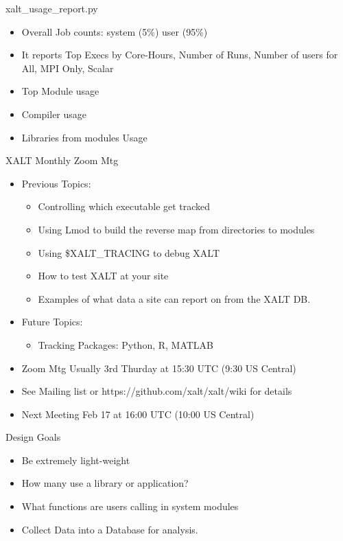 \documentclass{beamer}
\begin{document}
\begin{frame}{xalt\_usage\_report.py}
  \begin{itemize}
    \item Overall Job counts: system (5\%) user (95\%)
    \item It reports Top Execs by Core-Hours, Number of Runs,
      Number of users for All, MPI Only, Scalar
    \item Top Module usage
    \item Compiler usage
    \item Libraries from modules Usage
  \end{itemize}
\end{frame}

\begin{frame}{XALT Monthly Zoom Mtg}
  \begin{itemize}
    \item Previous Topics:
      \begin{itemize}
        \item Controlling which executable get tracked
        \item Using Lmod to build the reverse map from directories to modules
        \item Using \$XALT\_TRACING to debug XALT
        \item How to test XALT at your site
        \item Examples of what data a site can report on from the XALT DB.
      \end{itemize}
    \item Future Topics:
      \begin{itemize}
        \item Tracking Packages: Python, R, MATLAB
      \end{itemize}
    \item Zoom Mtg Usually 3rd Thurday at 15:30 UTC (9:30 US Central)
    \item See Mailing list or https://github.com/xalt/xalt/wiki for
      details
    \item Next Meeting Feb 17 at 16:00 UTC (10:00 US Central)
  \end{itemize}
\end{frame}

\begin{frame}{Design Goals}
  \begin{itemize}
    \item Be extremely light-weight
    \item How many use a library or application?
    \item What functions are users calling in system modules
    \item Collect Data into a Database for analysis.
  \end{itemize}
\end{frame}
\end{document}

